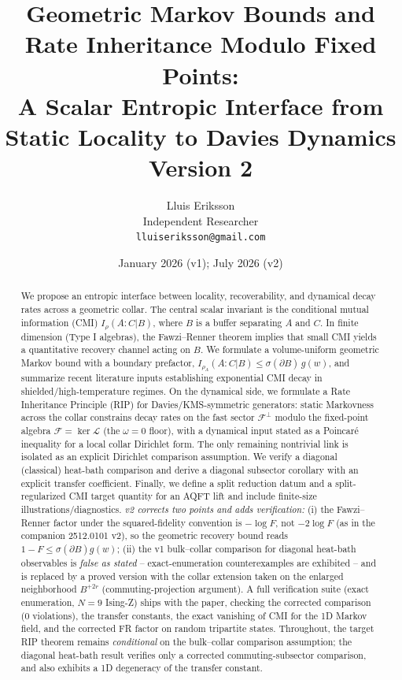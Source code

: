 \documentclass[11pt]{article}
\title{Geometric Markov Bounds and Rate Inheritance Modulo Fixed Points:\\
{\large A Scalar Entropic Interface from Static Locality to Davies Dynamics}\\
{\normalsize Version 2}}
\author{Lluis Eriksson\\ Independent Researcher\\ \texttt{lluiseriksson@gmail.com}}
\date{January 2026 (v1); July 2026 (v2)}
\theoremstyle{remark}
\begin{document}
\maketitle

\begin{abstract}
We propose an entropic interface between locality, recoverability, and
dynamical decay rates across a geometric collar. The central scalar
invariant is the conditional mutual information (CMI) $I_\rho(A:C|B)$,
where $B$ is a buffer separating $A$ and $C$. In finite dimension (Type I
algebras), the Fawzi--Renner theorem implies that small CMI yields a
quantitative recovery channel acting on $B$. We formulate a volume-uniform
geometric Markov bound with a boundary prefactor,
$I_{\rho_\Lambda}(A:C|B) \le \sigma(\partial B)\, g(w)$, and summarize
recent literature inputs establishing exponential CMI decay in
shielded/high-temperature regimes. On the dynamical side, we formulate a
Rate Inheritance Principle (RIP) for Davies/KMS-symmetric generators:
static Markovness across the collar constrains decay rates on the fast
sector $\mathcal{F}^\perp$ modulo the fixed-point algebra
$\mathcal{F} = \ker\mathcal{L}$ (the $\omega = 0$ floor), with a dynamical
input stated as a Poincar\'e inequality for a local collar Dirichlet form.
The only remaining nontrivial link is isolated as an explicit Dirichlet
comparison assumption. We verify a diagonal (classical) heat-bath
comparison and derive a diagonal subsector corollary with an explicit
transfer coefficient. Finally, we define a split reduction datum and a
split-regularized CMI target quantity for an AQFT lift and include
finite-size illustrations/diagnostics. \emph{v2 corrects two points and
adds verification:} (i) the Fawzi--Renner factor under the squared-fidelity
convention is $-\log F$, not $-2\log F$ (as in the companion 2512.0101 v2),
so the geometric recovery bound reads $1 - F \le \sigma(\partial B) g(w)$;
(ii) the v1 bulk--collar comparison for diagonal heat-bath observables is
\emph{false as stated} -- exact-enumeration counterexamples are exhibited --
and is replaced by a proved version with the collar extension taken on the
enlarged neighborhood $B^{+2r}$ (commuting-projection argument). A full
verification suite (exact enumeration, $N = 9$ Ising-Z) ships with the
paper, checking the corrected comparison (0 violations), the transfer
constants, the exact vanishing of CMI for the 1D Markov field, and the
corrected FR factor on random tripartite states. Throughout, the target
RIP theorem remains \emph{conditional} on the bulk--collar comparison
assumption; the diagonal heat-bath result verifies only a corrected
commuting-subsector comparison, and also exhibits a 1D degeneracy of the
transfer constant.
\end{abstract}
\end{document}
